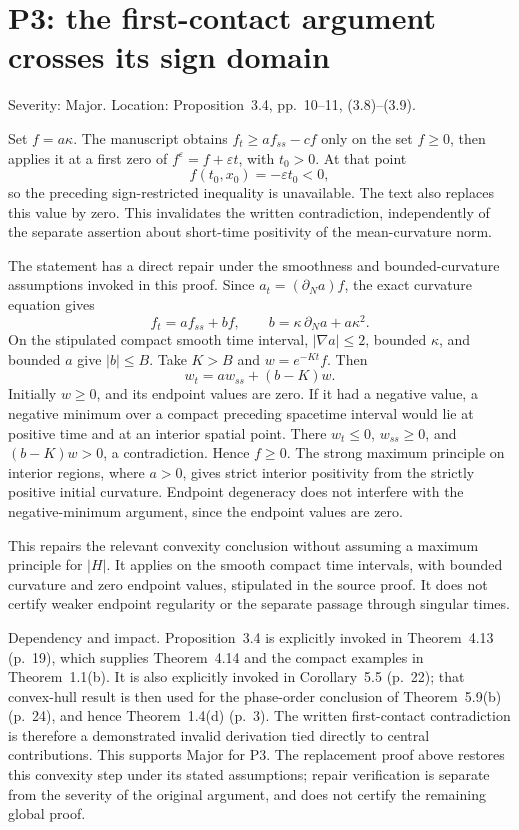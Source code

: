 \documentclass[10pt]{article}
\begin{document}
\section*{P3: the first-contact argument crosses its sign domain}
Severity: Major. Location: Proposition 3.4, pp. 10–11, (3.8)–(3.9).\par
Set \(f=a\kappa\). The manuscript obtains \(f_t\geq a f_{ss}-cf\) only on the set \(f\geq0\), then applies it at a first zero of \(f^\varepsilon=f+\varepsilon t\), with \(t_0>0\). At that point \[f(t_0,x_0)=-\varepsilon t_0<0,\] so the preceding sign-restricted inequality is unavailable. The text also replaces this value by zero. This invalidates the written contradiction, independently of the separate assertion about short-time positivity of the mean-curvature norm.\par
The statement has a direct repair under the smoothness and bounded-curvature assumptions invoked in this proof. Since \(a_t=(\partial_Na)f\), the exact curvature equation gives \[f_t=a f_{ss}+b f,\qquad b=\kappa\,\partial_Na+a\kappa^2.\] On the stipulated compact smooth time interval, \(|\nabla a|\leq2\), bounded \(\kappa\), and bounded \(a\) give \(|b|\leq B\). Take \(K>B\) and \(w=e^{-Kt}f\). Then \[w_t=a w_{ss}+(b-K)w.\] Initially \(w\geq0\), and its endpoint values are zero. If it had a negative value, a negative minimum over a compact preceding spacetime interval would lie at positive time and at an interior spatial point. There \(w_t\leq0\), \(w_{ss}\geq0\), and \((b-K)w>0\), a contradiction. Hence \(f\geq0\). The strong maximum principle on interior regions, where \(a>0\), gives strict interior positivity from the strictly positive initial curvature. Endpoint degeneracy does not interfere with the negative-minimum argument, since the endpoint values are zero.\par
This repairs the relevant convexity conclusion without assuming a maximum principle for \(|H|\). It applies on the smooth compact time intervals, with bounded curvature and zero endpoint values, stipulated in the source proof. It does not certify weaker endpoint regularity or the separate passage through singular times.\par
Dependency and impact. Proposition 3.4 is explicitly invoked in Theorem 4.13 (p. 19), which supplies Theorem 4.14 and the compact examples in Theorem 1.1(b). It is also explicitly invoked in Corollary 5.5 (p. 22); that convex-hull result is then used for the phase-order conclusion of Theorem 5.9(b) (p. 24), and hence Theorem 1.4(d) (p. 3). The written first-contact contradiction is therefore a demonstrated invalid derivation tied directly to central contributions. This supports Major for P3. The replacement proof above restores this convexity step under its stated assumptions; repair verification is separate from the severity of the original argument, and does not certify the remaining global proof.\par
\end{document}
